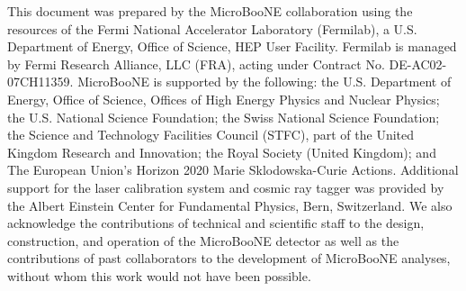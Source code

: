 \documentclass[aps,prd,reprint,longbibliography,superscriptaddress,nofootinbib]{revtex4-2}
\begin{document}
\begin{acknowledgments}
This document was prepared by the MicroBooNE collaboration using the resources of the Fermi National Accelerator Laboratory (Fermilab), a U.S. Department of Energy, Office of Science, HEP User Facility. Fermilab is managed by Fermi Research Alliance, LLC (FRA), acting under Contract No. DE-AC02-07CH11359.  MicroBooNE is supported by the following: the U.S. Department of Energy, Office of Science, Offices of High Energy Physics and Nuclear Physics; the U.S. National Science Foundation; the Swiss National Science Foundation; the Science and Technology Facilities Council (STFC), part of the United Kingdom Research and Innovation; the Royal Society (United Kingdom); and The European Union’s Horizon 2020 Marie Sklodowska-Curie Actions. Additional support for the laser calibration system and cosmic ray tagger was provided by the Albert Einstein Center for Fundamental Physics, Bern, Switzerland. We also acknowledge the contributions of technical and scientific staff to the design, construction, and operation of the MicroBooNE detector as well as the contributions of past collaborators to the development of MicroBooNE analyses, without whom this work would not have been possible.
\end{acknowledgments}





\nocite{*}
\end{document}
